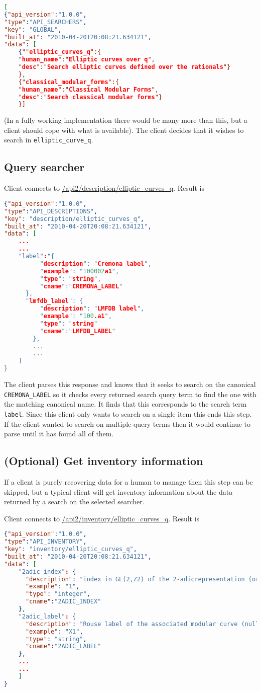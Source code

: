 \documentclass[11pt]{article}
\begin{document}
\begin{lstlisting}[language=json,firstnumber=1]
[
{"api_version":"1.0.0",
"type":"API_SEARCHERS",
"key": "GLOBAL",
"built_at": "2010-04-20T20:08:21.634121",
"data": [
	{""elliptic_curves_q":{
	"human_name":"Elliptic curves over q",
	"desc":"Search elliptic curves defined over the rationals"}
	},
	{"classical_modular_forms":{
	"human_name":"Classical Modular Forms",
	"desc":"Search classical modular forms"}
	}]
\end{lstlisting}
(In a fully working implementation there would be many more than this, but a client should cope with what is available). The client decides that it wishes to search in \texttt{elliptic\_curve\_q}.
\subsection{Query searcher}
Client connects to \url{/api2/description/elliptic_curves_q}. Result is
\begin{lstlisting}[language=json,firstnumber=1]
{"api_version":"1.0.0",
"type":"API_DESCRIPTIONS",
"key": "description/elliptic_curves_q",
"built_at": "2010-04-20T20:08:21.634121",
"data": [
	...
	...
	"label":"{
	      "description": "Cremona label", 
	      "example": "100002a1", 
	      "type": "string",
	      "cname":"CREMONA_LABEL"
	  },
	  "lmfdb_label": {
	      "description": "LMFDB label", 
	      "example": "100.a1", 
	      "type": "string"
	      "cname":"LMFDB_LABEL"
	    },
	    ...
	    ...
	]
}
\end{lstlisting}
The client parses this response and knows that it seeks to search on the canonical \texttt{CREMONA\_LABEL} so it checks every returned search query term to find the one with the matching canonical name. It finds that this corresponds to the search term \texttt{label}. Since this client only wants to search on a single item this ends this step. If the client wanted to search on multiple query terms then it would continue to parse until it has found all of them.
\subsection{(Optional) Get inventory information}
If a client is purely recovering data for a human to manage then this step can be skipped, but a typical client will get inventory information about the data returned by a search on the selected searcher.

Client connects to \url{/api2/inventory/elliptic_curves_q}. Result is
\begin{lstlisting}[language=json,firstnumber=1]
{"api_version":"1.0.0",
"type":"API_INVENTORY",
"key": "inventory/elliptic_curves_q",
"built_at": "2010-04-20T20:08:21.634121",
"data": [
    "2adic_index": {
      "description": "index in GL(2,Z2) of the 2-adicrepresentation (or 0 for CM curves)", 
      "example": "1", 
      "type": "integer",
      "cname":"2ADIC_INDEX"
    }, 
    "2adic_label": {
      "description": "Rouse label of the associated modular curve (null for CM curves). Based on Rouse, Zureik-Brown classification", 
      "example": "X1", 
      "type": "string",
      "cname":"2ADIC_LABEL"
    }, 
    ...
    ...
    ]
}
\end{lstlisting}
\end{document}
